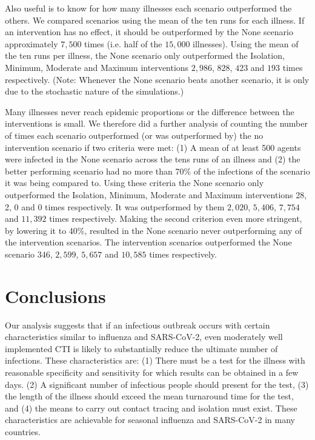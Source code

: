 \documentclass{article}
\begin{document}
Also useful is to know for how many illnesses each scenario outperformed the
others. We compared scenarios using the mean of the ten runs for each
illness. If an intervention has no effect, it should be outperformed by the None
scenario approximately $7,500$ times (i.e. half of the $15,000$
illnesses). Using the mean of the ten runs per illness, the None scenario only
outperformed the Isolation, Minimum, Moderate and Maximum interventions $2,986$,
$828$, $423$ and $193$ times respectively. (Note: Whenever the None scenario beats
another scenario, it is only due to the stochastic nature of the simulations.)

Many illnesses never reach epidemic proportions or the difference between the
interventions is small. We therefore did a further analysis of counting the
number of times each scenario outperformed (or was outperformed by) the no
intervention scenario if two criteria were met: (1) A mean of at least 500
agents were infected in the None scenario across the tens runs of an illness and
(2) the better performing scenario had no more than 70\% of the infections of
the scenario it was being compared to. Using these criteria the None scenario
only outperformed the Isolation, Minimum, Moderate and Maximum interventions 28,
2, 0 and 0 times respectively. It was outperformed by them $2,020$, $5,406$,
$7,754$ and $11,392$ times respectively. Making the second criterion even more
stringent, by lowering it to 40\%, resulted in the None scenario never
outperforming any of the intervention scenarios. The intervention scenarios
outperformed the None scenario $346$, $2,599$, $5,657$ and $10,585$ times
respectively.

\section{Conclusions}\label{conclusions}

Our analysis suggests that if an infectious outbreak occurs with certain
characteristics similar to influenza and SARS-CoV-2, even moderately well
implemented CTI is likely to substantially reduce the ultimate
number of infections. These characteristics are: (1) There must be a test for
the illness with reasonable specificity and sensitivity for which results can be
obtained in a few days. (2) A significant number of infectious people should
present for the test, (3) the length of the illness should exceed the mean
turnaround time for the test, and (4) the means to carry out contact tracing and
isolation must exist. These characteristics are achievable for seasonal
influenza and SARS-CoV-2 in many countries.
\end{document}
